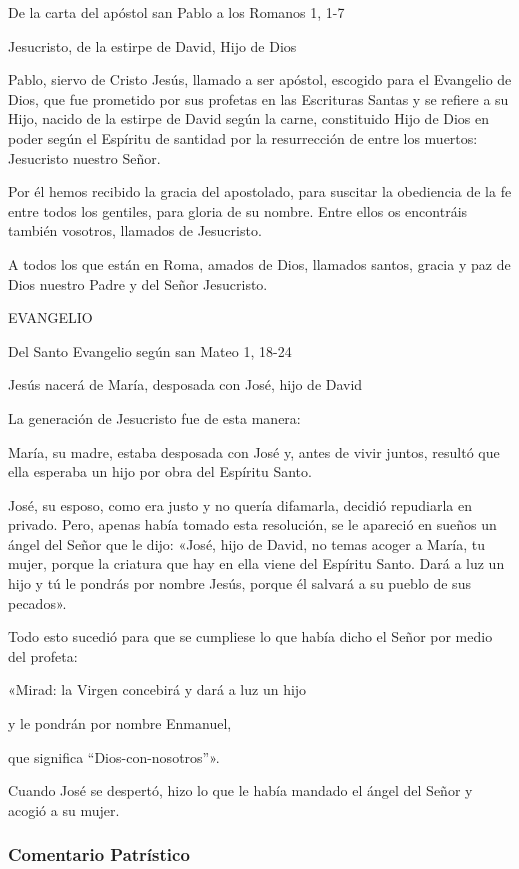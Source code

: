 \documentclass[]{article}
\begin{document}
De la carta del apóstol san Pablo a los Romanos 1, 1-7

Jesucristo, de la estirpe de David, Hijo de Dios

Pablo, siervo de Cristo Jesús, llamado a ser apóstol, escogido para el
Evangelio de Dios, que fue prometido por sus profetas en las Escrituras
Santas y se refiere a su Hijo, nacido de la estirpe de David según la
carne, constituido Hijo de Dios en poder según el Espíritu de santidad
por la resurrección de entre los muertos: Jesucristo nuestro Señor.

Por él hemos recibido la gracia del apostolado, para suscitar la
obediencia de la fe entre todos los gentiles, para gloria de su nombre.
Entre ellos os encontráis también vosotros, llamados de Jesucristo.

A todos los que están en Roma, amados de Dios, llamados santos, gracia y
paz de Dios nuestro Padre y del Señor Jesucristo.

EVANGELIO

Del Santo Evangelio según san Mateo 1, 18-24

Jesús nacerá de María, desposada con José, hijo de David

La generación de Jesucristo fue de esta manera:

María, su madre, estaba desposada con José y, antes de vivir juntos,
resultó que ella esperaba un hijo por obra del Espíritu Santo.

José, su esposo, como era justo y no quería difamarla, decidió
repudiarla en privado. Pero, apenas había tomado esta resolución, se le
apareció en sueños un ángel del Señor que le dijo: «José, hijo de David,
no temas acoger a María, tu mujer, porque la criatura que hay en ella
viene del Espíritu Santo. Dará a luz un hijo y tú le pondrás por nombre
Jesús, porque él salvará a su pueblo de sus pecados».

Todo esto sucedió para que se cumpliese lo que había dicho el Señor por
medio del profeta:

«Mirad: la Virgen concebirá y dará a luz un hijo

y le pondrán por nombre Enmanuel,

que significa ``Dios-con-nosotros''».

Cuando José se despertó, hizo lo que le había mandado el ángel del Señor
y acogió a su mujer.



\subsubsection{Comentario Patrístico}\label{comentario-patruxedstico-3}
\end{document}
